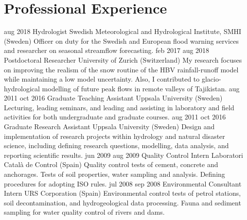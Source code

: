   \section{Professional Experience}
    \position
      {aug 2018 \textemdash{} }
      {Hydrologist}
      {Swedish Meteorological and Hydrological Institute, SMHI (Sweden)}
      {Officer on duty for the Swedish and European flood warning services and researcher on seasonal streamflow forecasting.}
    \position
      {feb 2017 \textemdash{} aug 2018}
      {Postdoctoral Researcher}
      {University of Zurich (Switzerland)}
      {My research focuses on improving the realism of the snow routine of the HBV rainfall-runoff model while maintaining a low model uncertainty. Also, I contributed to glacio-hydrological modelling of future peak flows in remote valleys of Tajikistan.}
    \position
      {aug 2011 \textemdash{} oct 2016}
      {Graduate Teaching Assistant}
      {Uppsala University (Sweden)}
      {Lecturing, leading seminars, and leading and assisting in laboratory and field activities for both undergraduate and graduate courses.}
    \position
      {aug 2011 \textemdash{} oct 2016}
      {Graduate Research Assistant}
      {Uppsala University (Sweden)}
      {Design and implementation of research projects within hydrology and natural disaster science, including defining research questions, modelling, data analysis, and reporting scientific results.}
    \position
      {jun 2009 \textemdash{} aug 2009}
      {Quality Control Intern}
      {Laboratori Català de Control (Spain)}
      {Quality control tests of cement, concrete and anchorages. Tests of soil properties, water sampling and analysis. Defining procedures for adopting ISO rules.}
    \position
      {jul 2008 \textemdash{} sep 2008}
      {Environmental Consultant Intern}
      {URS Corporation (Spain)}
      {Environmental control tests of petrol stations, soil decontamination, and hydrogeological data processing. Fauna and sediment sampling for water quality control of rivers and dams.}
\fi
